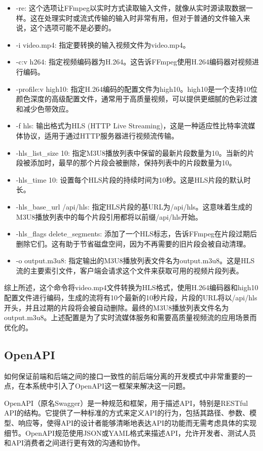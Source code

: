 \documentclass[main.tex]{subfiles}
\begin{document}
\begin{itemize}
    \item -re: 这个选项让FFmpeg以实时方式读取输入文件，就像从实时源读取数据一样。这在处理实时或流式传输的输入时非常有用，但对于普通的文件输入来说，这个选项可能不是必要的。
    \item -i video.mp4: 指定要转换的输入视频文件为video.mp4。
    \item -c:v h264: 指定视频编码器为H.264。这告诉FFmpeg使用H.264编码器对视频进行编码。
    \item -profile:v high10: 指定H.264编码的配置文件为high10。high10是一个支持10位颜色深度的高级配置文件，通常用于高质量视频，可以提供更细腻的色彩过渡和减少色带效应。
    \item -f hls: 输出格式为HLS (HTTP Live Streaming)，这是一种适应性比特率流媒体协议，适用于通过HTTP服务器进行视频流传输。
    \item -hls\_list\_size 10: 指定M3U8播放列表中保留的最新片段数量为10。当新的片段被添加时，最早的那个片段会被删除，保持列表中的片段数量为10。
    \item -hls\_time 10: 设置每个HLS片段的持续时间为10秒。这是HLS片段的默认时长。
    \item -hls\_base\_url /api/hls: 指定HLS片段的基URL为/api/hls。这意味着生成的M3U8播放列表中的每个片段引用都将以前缀/api/hls开始。
    \item -hls\_flags delete\_segments: 添加了一个HLS标志，告诉FFmpeg在片段过期后删除它们。这有助于节省磁盘空间，因为不再需要的旧片段会被自动清理。
    \item -o output.m3u8: 指定输出的M3U8播放列表文件名为output.m3u8。这是HLS流的主要索引文件，客户端会请求这个文件来获取可用的视频片段列表。
    
\end{itemize}

综上所述，这个命令将video.mp4文件转换为HLS格式，使用H.264编码器和high10配置文件进行编码，生成的流将有10个最新的10秒片段，片段的URL将以/api/hls开头，并且过期的片段将会被自动删除。最终的M3U8播放列表文件名为output.m3u8。上述配置是为了实时流媒体服务和需要高质量视频流的应用场景而优化的。

\subsection{OpenAPI}

如何保证前端和后端之间的接口一致性的前后端分离的开发模式中非常重要的一点，在本系统中引入了OpenAPI这一框架来解决这一问题。

OpenAPI（原名Swagger）是一种规范和框架，用于描述API，特别是RESTful API的结构。它提供了一种标准的方式来定义API的行为，包括其路径、参数、模型、响应等，使得API的设计者能够清晰地表达API的功能而无需考虑具体的实现细节。OpenAPI规范使用JSON或YAML格式来描述API，允许开发者、测试人员和API消费者之间进行更有效的沟通和协作。
\end{document}
